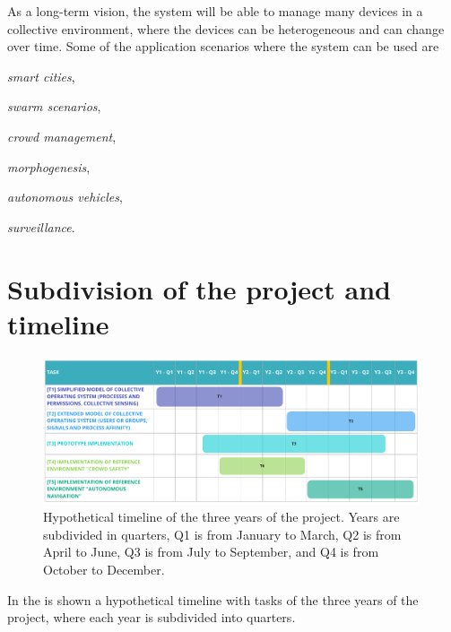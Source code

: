 \documentclass[12pt, a4paper]{article}
\newenvironment{inlinelist}{\begin{enumerate*}[label=\emph{(\roman*)}]}{\end{enumerate*}}
\begin{document}
As a long-term vision,
the system will be able to manage many devices in a collective environment,
where the devices can be heterogeneous and can change over time.
%
Some of the application scenarios where the system can be used are
\begin{inlinelist}
    \item \emph{smart cities},
    \item \emph{swarm scenarios},
    \item \emph{crowd management},
    \item \emph{morphogenesis},
    \item \emph{autonomous vehicles},
    \item \emph{surveillance}.
\end{inlinelist}

\section{Subdivision of the project and timeline}
\label{sec:subdivision-of-the-project-and-timeline}

\begin{figure}
    \centering
    \includegraphics[width=0.99\textwidth]{figures/timeline}
    \caption{Hypothetical timeline of the three years of the project.
        Years are subdivided in quarters, Q1 is from January to March,
        Q2 is from April to June, Q3 is from July to September, and Q4 is from October to December.
    }\label{fig:timeline}
\end{figure}

In the  is shown a hypothetical timeline with tasks of the three years of the project,
where each year is subdivided into quarters.

\sloppypar
\end{document}
